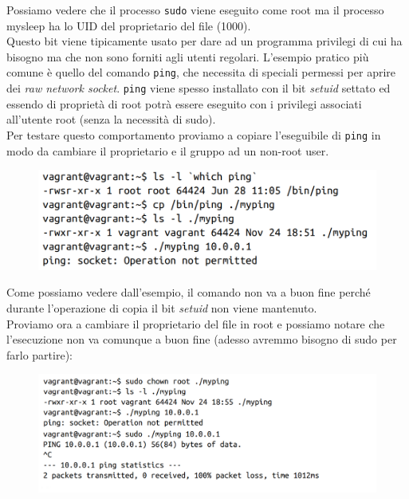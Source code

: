 Possiamo vedere che il processo \verb|sudo| viene eseguito come root ma il processo
mysleep ha lo UID del proprietario del file (1000).\\

Questo bit viene tipicamente usato per dare ad un programma privilegi di cui ha
bisogno ma che non sono forniti agli utenti regolari. L'esempio pratico più comune
è quello del comando \verb|ping|, che necessita di speciali permessi per aprire
dei \textit{raw network socket}. \verb|ping| viene spesso installato con il bit
\textit{setuid} settato ed essendo di proprietà di root potrà essere eseguito con
i privilegi associati all'utente root (senza la necessità di sudo).\\
Per testare questo comportamento proviamo a copiare l'eseguibile di \verb|ping|
in modo da cambiare il proprietario e il gruppo ad un non-root user.

\begin{figure}[H]
    \centering
    \includegraphics[width=\textwidth, keepaspectratio]{capitoli/os_security/imgs/ping1.png}
\end{figure}

Come possiamo vedere dall'esempio, il comando non va a buon fine perché durante
l'operazione di copia il bit \textit{setuid} non viene mantenuto.\\

Proviamo ora a cambiare il proprietario del file in root e possiamo notare che
l'esecuzione non va comunque a buon fine (adesso avremmo bisogno di sudo per farlo partire):

\begin{figure}[H]
    \centering
    \includegraphics[width=\textwidth, keepaspectratio]{capitoli/os_security/imgs/ping2.png}
\end{figure}

